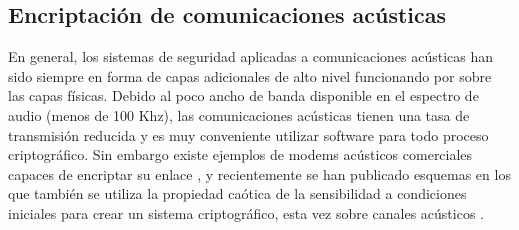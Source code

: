 \subsection{Encriptación de comunicaciones acústicas}

En general, los sistemas de seguridad aplicadas a comunicaciones acústicas han sido siempre en forma de capas adicionales de alto nivel funcionando por sobre las capas físicas. Debido al poco ancho de banda disponible en el espectro de audio (menos de 100 Khz), las comunicaciones acústicas tienen una tasa de transmisión reducida y es muy conveniente utilizar software para todo proceso criptográfico. Sin embargo existe ejemplos de modems acústicos comerciales capaces de encriptar su enlace \cite{arcelect}, y recientemente se han publicado esquemas en los que también se utiliza la propiedad caótica de la sensibilidad a condiciones iniciales para crear un sistema criptográfico, esta vez sobre canales acústicos \cite{gnanajeyaraman2009audio}.
